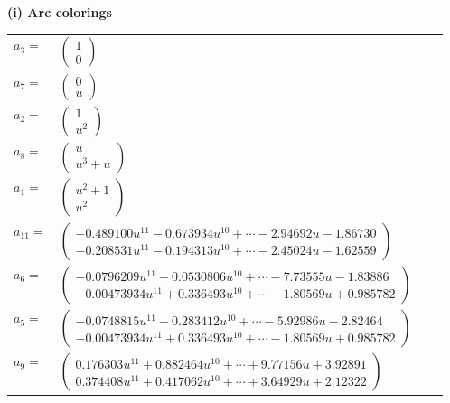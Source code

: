 \documentclass[1p]{elsarticle_modified}
\theoremstyle{definition}
\begin{document}
\flushleft \textbf{(i) Arc colorings}\\
\begin{tabular}{m{7pt} m{180pt} m{7pt} m{180pt} }
\flushright $a_{3}=$&$\begin{pmatrix}1\\0\end{pmatrix}$ \\
\flushright $a_{7}=$&$\begin{pmatrix}0\\u\end{pmatrix}$ \\
\flushright $a_{2}=$&$\begin{pmatrix}1\\u^2\end{pmatrix}$ \\
\flushright $a_{8}=$&$\begin{pmatrix}u\\u^3+u\end{pmatrix}$ \\
\flushright $a_{1}=$&$\begin{pmatrix}u^2+1\\u^2\end{pmatrix}$ \\
\flushright $a_{11}=$&$\begin{pmatrix}-0.489100 u^{11}-0.673934 u^{10}+\cdots-2.94692 u-1.86730\\-0.208531 u^{11}-0.194313 u^{10}+\cdots-2.45024 u-1.62559\end{pmatrix}$ \\
\flushright $a_{6}=$&$\begin{pmatrix}-0.0796209 u^{11}+0.0530806 u^{10}+\cdots-7.73555 u-1.83886\\-0.00473934 u^{11}+0.336493 u^{10}+\cdots-1.80569 u+0.985782\end{pmatrix}$ \\
\flushright $a_{5}=$&$\begin{pmatrix}-0.0748815 u^{11}-0.283412 u^{10}+\cdots-5.92986 u-2.82464\\-0.00473934 u^{11}+0.336493 u^{10}+\cdots-1.80569 u+0.985782\end{pmatrix}$ \\
\flushright $a_{9}=$&$\begin{pmatrix}0.176303 u^{11}+0.882464 u^{10}+\cdots+9.77156 u+3.92891\\0.374408 u^{11}+0.417062 u^{10}+\cdots+3.64929 u+2.12322\end{pmatrix}$ \\

\end{tabular}
\end{document}
